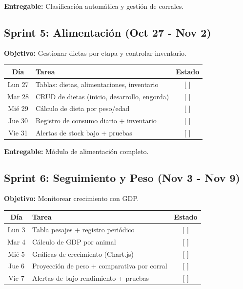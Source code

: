 \documentclass[11pt,a4paper]{article}
\begin{document}
\textbf{Entregable:} Clasificación automática y gestión de corrales.

\vspace{0.5cm}

\subsection*{Sprint 5: Alimentación (Oct 27 - Nov 2)}

\textbf{Objetivo:} Gestionar dietas por etapa y controlar inventario.

\begin{center}
\begin{tabularx}{\textwidth}{|c|X|c|}
\hline
\rowcolor{verdeclaro}
\textbf{Día} & \textbf{Tarea} & \textbf{Estado} \\
\hline
Lun 27 & Tablas: dietas, alimentaciones, inventario & [ ] \\
\hline
Mar 28 & CRUD de dietas (inicio, desarrollo, engorda) & [ ] \\
\hline
Mié 29 & Cálculo de dieta por peso/edad & [ ] \\
\hline
Jue 30 & Registro de consumo diario + inventario & [ ] \\
\hline
Vie 31 & Alertas de stock bajo + pruebas & [ ] \\
\hline
\end{tabularx}
\end{center}

\textbf{Entregable:} Módulo de alimentación completo.

\vspace{0.5cm}

\subsection*{Sprint 6: Seguimiento y Peso (Nov 3 - Nov 9)}

\textbf{Objetivo:} Monitorear crecimiento con GDP.

\begin{center}
\begin{tabularx}{\textwidth}{|c|X|c|}
\hline
\rowcolor{verdeclaro}
\textbf{Día} & \textbf{Tarea} & \textbf{Estado} \\
\hline
Lun 3 & Tabla pesajes + registro periódico & [ ] \\
\hline
Mar 4 & Cálculo de GDP por animal & [ ] \\
\hline
Mié 5 & Gráficas de crecimiento (Chart.js) & [ ] \\
\hline
Jue 6 & Proyección de peso + comparativa por corral & [ ] \\
\hline
Vie 7 & Alertas de bajo rendimiento + pruebas & [ ] \\
\hline
\end{tabularx}
\end{center}
\end{document}
